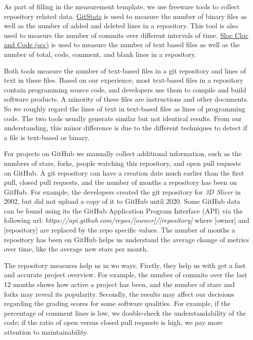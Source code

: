 \documentclass[final, 3p, times, authoryear]{elsarticle}
\begin{document}
As part of filling in the measurement template, we use freeware tools to collect
repository related data. \href{https://github.com/tomgi/git_stats}{GitStats}
\citep{Gieniusz2019} is used to measure the number of binary files as well as
the number of added and deleted lines in a repository. This tool is also used to
measure the number of commits over different intervals of time.
\href{https://github.com/boyter/scc}{Sloc Cloc and Code (scc)}
\citep{Boyter2021} is used to measure the number of text based files as well as
the number of total, code, comment, and blank lines in a repository.

Both tools measure the number of text-based files in a git repository and lines
of text in these files. Based on our experience, most text-based files in a
repository contain programming source code, and developers use them to compile
and build software products. A minority of these files are instructions and
other documents. So we roughly regard the lines of text in text-based files as
lines of programming code. The two tools usually generate similar but not
identical results. From our understanding, this minor difference is due to the
different techniques to detect if a file is text-based or binary.

For projects on GitHub we manually collect additional information, such as the
numbers of stars, forks, people watching this repository, and open pull requests
on GitHub. A git repository can have a creation date much earlier than the first
pull, closed pull requests, and the number of months a repository has been on
GitHub. For example, the developers created the git repository for \textit{3D
Slicer} in 2002, but did not upload a copy of it to GitHub until 2020. Some
GitHub data can be found using its the GitHub Application Program Interface
(API) via the following url:
\textit{https://api.github.com/repos/[owner]/[repository]} where [owner] and
[repository] are replaced by the repo specific values. The number of months a
repository has been on GitHub helps us understand the average change of metrics
over time, like the average new stars per month. 

The repository measures help us in wo ways. Firstly, they help us with get a
fast and accurate project overview. For example, the number of commits over the
last 12 months shows how active a project has been, and the number of stars and
forks may reveal its popularity. Secondly, the results may affect our decisions
regarding the grading scores for some software qualities. For example, if the
percentage of comment lines is low, we double-check the
understandability of the code; if the ratio of open versus closed pull
requests is high, we pay more attention to maintainability.
\end{document}
